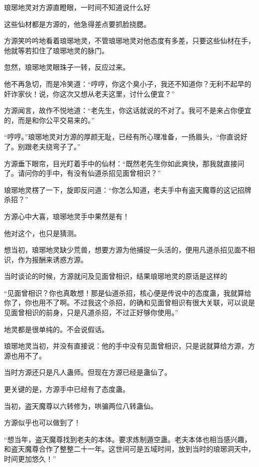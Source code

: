 
\begin{this_body}

琅琊地灵对方源直瞪眼，一时间不知道说什么好

这些仙材都是方源的，他急得差点要抓脸挠腮。

方源笑吟吟地看着琅琊地灵，不管琅琊地灵对他态度有多差，只要这些仙材在手，他就等若扣住了琅琊地灵的脉门。

忽然，琅琊地灵眼珠子一转，反应过来。

他不再急切，而是冷笑道：“哼哼，你这个臭小子，我还不知道你？无利不起早的奸诈家伙！说，你这次又想从老夫这里，讨什么便宜？”

方源闻言，故作不悦地道：“老先生，你这话就说的不对了。我可不是来占你便宜的，而是和你公平交易来的。”

“哼哼。”琅琊地灵对方源的厚颜无耻，已经有所心理准备，一扬眉头，“你直说好了。别跟老夫绕弯子了。”

方源垂下眼帘，目光盯着手中的仙材：“既然老先生你如此爽快，那我就直接问了。请问你的手中，有没有仙道杀招见面曾相识？”

琅琊地灵楞了一下，旋即反问道：“你怎么知道，老夫手中有盗天魔尊的这记招牌杀招？”

方源心中大喜，琅琊地灵手中果然是有！

他对这个，也只是猜测。

想当初，琅琊地灵缺少荒兽，想要方源为他捕捉一头活的，便用凡道杀招见面不相识，作为报酬来诱惑方源。

当时谈论的时候，方源就问及见面曾相识，结果琅琊地灵的原话是这样的

“见面曾相识？你也真敢想！那是仙道杀招，核心便是传说中的态度蛊，我就算给你了，你也用不了啊。不过我这个杀招，的确和见面曾相识有很大关联，可以说是见面曾相识的前身，只是凡道杀招，不过正好够你使用。”

地灵都是很单纯的。不会说假话。

琅琊地灵当初，并没有直接说：他的手中没有见面曾相识，只是说就算给方源，方源也用不了。

当时方源还只是凡人蛊师。但现在方源已经是蛊仙了。

更关键的是，方源手中已经有了态度蛊。

当初，盗天魔尊以六转修为，哄骗两位八转蛊仙。

方源似乎也可以做到了！

“想当年，盗天魔尊找到老夫的本体。要求炼制遁空蛊。老夫本体也相当感兴趣，和盗天魔尊合作了整整二十一年。这世间可是五域时间，放到当时的琅琊洞天中，时间更加悠久！”


\end{this_body}
